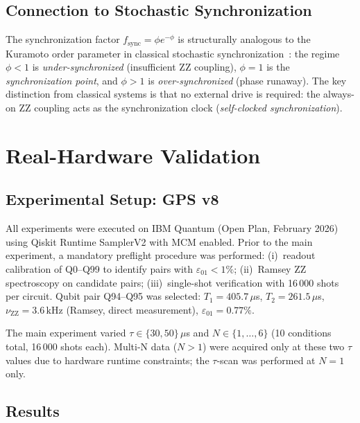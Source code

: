 \documentclass[10pt,twocolumn]{article}
\newcommand{\nuZZ}{\nu_{\mathrm{ZZ}}}
\newcommand{\eps}{\varepsilon}
\begin{document}
\subsection{Connection to Stochastic Synchronization}

The synchronization factor $f_\mathrm{sync} = \phi e^{-\phi}$ is structurally
analogous to the Kuramoto order parameter in classical stochastic
synchronization~\cite{Pikovsky1997,Kuramoto1984}: the regime $\phi < 1$ is
\emph{under-synchronized} (insufficient ZZ coupling), $\phi = 1$ is the
\emph{synchronization point}, and $\phi > 1$ is \emph{over-synchronized}
(phase runaway).
The key distinction from classical systems is that no external drive is
required: the always-on ZZ coupling acts as the synchronization clock
(\emph{self-clocked synchronization}).


\section{Real-Hardware Validation}
\label{sec:hw}

\subsection{Experimental Setup: GPS v8}

All experiments were executed on IBM Quantum (Open Plan, February 2026)
using Qiskit Runtime SamplerV2 with MCM enabled.
Prior to the main experiment, a mandatory preflight procedure was performed:
(i)~readout calibration of Q0--Q99 to identify pairs with
$\eps_{01} < 1\%$; (ii)~Ramsey ZZ spectroscopy on candidate pairs;
(iii)~single-shot verification with 16\,000 shots per circuit.
Qubit pair Q94--Q95 was selected:
$T_1 = 405.7\,\mu$s, $T_2 = 261.5\,\mu$s,
$\nuZZ = 3.6\,\mathrm{kHz}$ (Ramsey, direct measurement),
$\eps_{01} = 0.77\%$.

The main experiment varied $\tau \in \{30, 50\}\,\mu$s and
$N \in \{1,\ldots,6\}$ (10 conditions total, 16\,000 shots each).
Multi-N data ($N>1$) were acquired only at these two $\tau$ values
due to hardware runtime constraints;
the $\tau$-scan was performed at $N=1$ only.

\subsection{Results}
\end{document}
